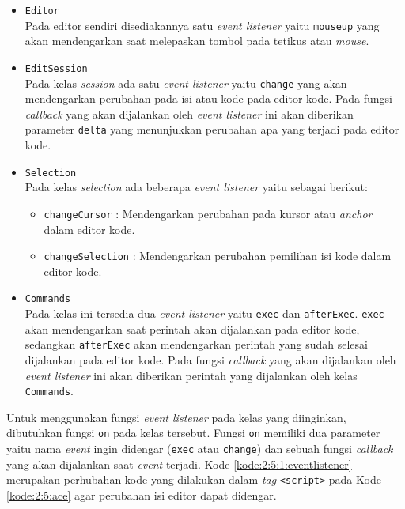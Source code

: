 \begin{itemize}
	\item \verb|Editor| \\
	      Pada editor sendiri disediakannya satu \textit{event listener} yaitu \verb|mouseup| yang akan mendengarkan saat melepaskan tombol pada tetikus atau \textit{mouse}.

	\item \verb|EditSession| \\
	      Pada kelas \textit{session} ada satu \textit{event listener} yaitu \verb|change| yang akan mendengarkan perubahan pada isi atau kode pada editor kode. Pada fungsi \textit{callback} yang akan dijalankan oleh \textit{event listener} ini akan diberikan parameter \verb|delta| yang menunjukkan perubahan apa yang terjadi pada editor kode.

	\item \verb|Selection| \\
	      Pada kelas \textit{selection} ada beberapa \textit{event listener} yaitu sebagai berikut:

	      \begin{itemize}
		      \item \verb|changeCursor| : Mendengarkan perubahan pada kursor atau \textit{anchor} dalam editor kode.
		      \item \verb|changeSelection| : Mendengarkan perubahan pemilihan isi kode dalam editor kode.
	      \end{itemize}

	\item \verb|Commands| \\
	      Pada kelas ini tersedia dua \textit{event listener} yaitu \verb|exec| dan \verb|afterExec|. \verb|exec| akan mendengarkan saat perintah akan dijalankan pada editor kode, sedangkan \verb|afterExec| akan mendengarkan perintah yang sudah selesai dijalankan pada editor kode. Pada fungsi \textit{callback} yang akan dijalankan oleh \textit{event listener} ini akan diberikan perintah yang dijalankan oleh kelas \verb|Commands|.
\end{itemize}

Untuk menggunakan fungsi \textit{event listener} pada kelas yang diinginkan, dibutuhkan fungsi \verb|on| pada kelas tersebut. Fungsi \verb|on| memiliki dua parameter yaitu nama \textit{event} ingin didengar (\verb|exec| atau \verb|change|) dan sebuah fungsi \textit{callback} yang akan dijalankan saat \textit{event} terjadi. Kode \ref{kode:2:5:1:eventlistener} merupakan perhubahan kode yang dilakukan dalam \textit{tag} \verb|<script>| pada Kode \ref{kode:2:5:ace} agar perubahan isi editor dapat didengar.

